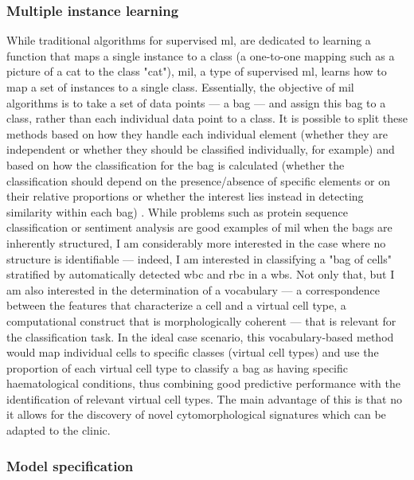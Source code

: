 \subsubsection{Multiple instance learning}

While traditional algorithms for supervised \ac{ml}, are dedicated to learning a function that maps a single instance to a class (a one-to-one mapping such as a picture of a cat to the class "cat"), \ac{mil}, a type of supervised \ac{ml}, learns how to map a set of instances to a single class. Essentially, the objective of \ac{mil} algorithms is to take a set of data points --- a bag --- and assign this bag to a class, rather than each individual data point to a class. It is possible to split these methods based on how they handle each individual element (whether they are independent or whether they should be classified individually, for example) and based on how the classification for the bag is calculated (whether the classification should depend on the presence/absence of specific elements or on their relative proportions or whether the interest lies instead in detecting similarity within each bag) \cite{Amores2013-ym,Carbonneau2016-xc}. While problems such as protein sequence classification or sentiment analysis are good examples of \ac{mil} when the bags are inherently structured, I am considerably more interested in the case where no structure is identifiable --- indeed, I am interested in classifying a "bag of cells" stratified by automatically detected \ac{wbc} and \ac{rbc} in a \ac{wbs}. Not only that, but I am also interested in the determination of a vocabulary --- a correspondence between the features that characterize a cell and a virtual cell type, a computational construct that is morphologically coherent --- that is relevant for the classification task. In the ideal case scenario, this vocabulary-based method would map individual cells to specific classes (virtual cell types) and use the proportion of each virtual cell type to classify a bag as having specific haematological conditions, thus combining good predictive performance with the identification of relevant virtual cell types. The main advantage of this is that no it allows for the discovery of novel cytomorphological signatures which can be adapted to the clinic.

\subsubsection{Model specification}

